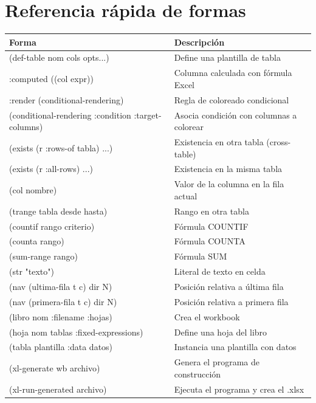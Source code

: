 \documentclass[12pt,a4paper]{report}
\begin{document}
\section{Referencia rápida de formas}
\label{sec:referencia}

\begin{center}
\renewcommand{\arraystretch}{1.4}
\begin{tabular}{>{\ttfamily}p{5.6cm}p{7.4cm}}
\toprule
\textbf{Forma} & \textbf{Descripción} \\
\midrule
(def-table nom cols opts...)     & Define una plantilla de tabla \\
:computed ((col expr))           & Columna calculada con fórmula Excel \\
:render (conditional-rendering)  & Regla de coloreado condicional \\
(conditional-rendering :condition :target-columns)
                                 & Asocia condición con columnas a colorear \\
(exists (r :rows-of tabla) ...)  & Existencia en otra tabla (cross-table) \\
(exists (r :all-rows) ...)       & Existencia en la misma tabla \\
(col nombre)                     & Valor de la columna en la fila actual \\
(trange tabla desde hasta)       & Rango en otra tabla \\
(countif rango criterio)         & Fórmula COUNTIF \\
(counta rango)                   & Fórmula COUNTA \\
(sum-range rango)                & Fórmula SUM \\
(str "texto")                    & Literal de texto en celda \\
(nav (ultima-fila t c) dir N)    & Posición relativa a última fila \\
(nav (primera-fila t c) dir N)   & Posición relativa a primera fila \\
(libro nom :filename :hojas)     & Crea el workbook \\
(hoja nom tablas :fixed-expressions)
                                 & Define una hoja del libro \\
(tabla plantilla :data datos)    & Instancia una plantilla con datos \\
(xl-generate wb archivo)         & Genera el programa de construcción \\
(xl-run-generated archivo)       & Ejecuta el programa y crea el .xlsx \\
\bottomrule
\end{tabular}
\end{center}
\end{document}
